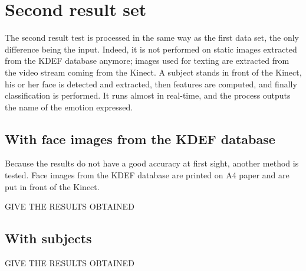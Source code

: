 \section{Second result set}

\vspace{\baselineskip}
\noindent The second result test is processed in the same way as the first data set, the only difference being the input. Indeed, it is not performed on static images extracted from the KDEF database anymore; images used for texting are extracted from the video stream coming from the Kinect. A subject stands in front of the Kinect, his or her face is detected and extracted, then features are computed, and finally classification is performed. It runs almost in real-time, and the process outputs the name of the emotion expressed.
\newline

\subsection{With face images from the KDEF database}

\vspace{\baselineskip}
\noindent Because the results do not have a good accuracy at first sight, another method is tested. Face images from the KDEF database are printed on A4 paper and are put in front of the Kinect.
\newline

\noindent GIVE THE RESULTS OBTAINED
\newline

\subsection{With subjects}

\vspace{\baselineskip}
\noindent GIVE THE RESULTS OBTAINED
\newline

